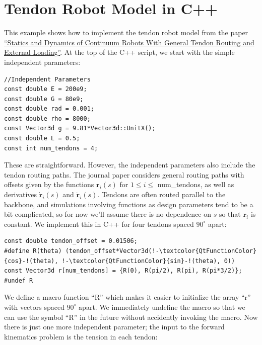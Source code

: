 \documentclass[12pt]{article}
\begin{document}
\makeatletter
\renewcommand{\@maketitle}{
\newpage
\null
\vskip 2em
\begin{center}
{\LARGE \@title \par}
\end{center}
\par
} \makeatother

\maketitle

\section{Tendon Robot Model in C++}

This example shows how to implement the tendon robot model from the paper \href{https://ieeexplore.ieee.org/document/5957337}{``Statics and Dynamics of Continuum Robots With General Tendon Routing and External Loading''}. At the top of the C++ script, we start with the simple independent parameters:
\begin{lstlisting}
//Independent Parameters
const double E = 200e9;
const double G = 80e9;
const double rad = 0.001;
const double rho = 8000;
const Vector3d g = 9.81*Vector3d::UnitX();
const double L = 0.5;
const int num_tendons = 4;
\end{lstlisting}
These are straightforward. However, the independent parameters also include the tendon routing paths. The journal paper considers general routing paths with offsets given by the functions $\boldsymbol{r}_i(s)$ for $1 \leq i \leq$ num\_tendons, as well as derivatives $\dot{\boldsymbol{r}}_i(s)$ and $\ddot{\boldsymbol{r}}_i(s)$. Tendons are often routed parallel to the backbone, and simulations involving functions as design parameters tend to be a bit complicated, so for now we'll assume there is no dependence on $s$ so that $\boldsymbol{r}_i$ is constant. We implement this in C++ for four tendons spaced $90^\circ$ apart:
\begin{lstlisting}
const double tendon_offset = 0.01506;
#define R(theta) (tendon_offset*Vector3d(!-\textcolor{QtFunctionColor}{cos}-!(theta), !-\textcolor{QtFunctionColor}{sin}-!(theta), 0))
const Vector3d r[num_tendons] = {R(0), R(pi/2), R(pi), R(pi*3/2)};
#undef R
\end{lstlisting}
We define a macro function ``R'' which makes it easier to initialize the array ``r'' with vectors spaced $90^\circ$ apart. We immediately undefine the macro so that we can use the symbol ``R'' in the future without accidently invoking the macro. Now there is just one more independent parameter; the input to the forward kinematics problem is the tension in each tendon:
\end{document}
